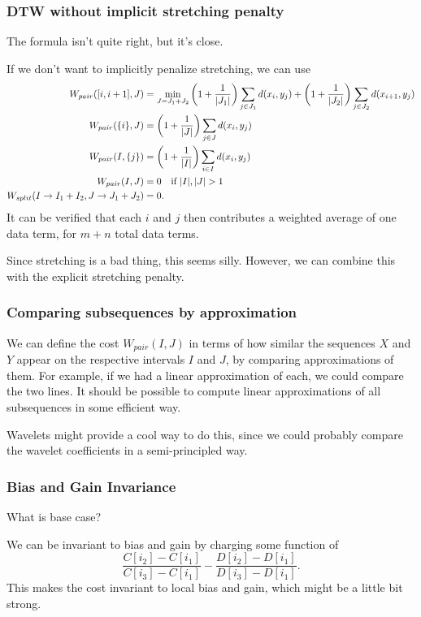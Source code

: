 \documentclass{article}
\begin{document}
\subsubsection{DTW without implicit stretching penalty}
The formula isn't quite right, but it's close.

If we don't want to implicitly penalize stretching, we can use
\begin{align*}
W_{pair}([i,i+1], J) &= \min_{J = J_1 + J_2} \left(1+ \frac{1}{|J_1|}\right) \sum_{j\in J_1} d(x_i,
y_j) + \left(1+ \frac{1}{|J_2|}\right) \sum_{j\in J_2} d(x_{i+1}, y_j)\\
W_{pair}(\{i\}, J) &= \left(1 + \frac{1}{|J|}\right) \sum_{j\in J} d(x_i, y_j) \\
W_{pair}(I, \{j\}) &= \left(1 + \frac{1}{|I|}\right) \sum_{i\in I} d(x_i, y_j) \\
W_{pair}(I, J) &= 0 \mbox{\quad if } |I|,|J| > 1 \\
W_{split}(I\to I_1 + I_2, J\to J_1 + J_2) &= 0.
\end{align*}
It can be verified that each $i$ and $j$ then contributes a weighted
average of one data term, for $m+n$ total data terms.

Since stretching is a bad thing, this seems silly. However, we can
combine this with the explicit stretching penalty.

\subsubsection{Comparing subsequences by approximation}

We can define the cost $W_{pair}(I,J)$ in terms of how similar the
sequences $X$ and $Y$ appear on the respective intervals $I$ and $J$,
by comparing approximations of them. For example, if we had a linear
approximation of each, we could compare the two lines. It should be
possible to compute linear approximations of all subsequences in some
efficient way.

Wavelets might provide a cool way to do this, since we could probably
compare the wavelet coefficients in a semi-principled way.

\subsubsection{Bias and Gain Invariance}

What is base case?

We can be invariant to bias and gain by charging some function of
$$\frac{C[i_2] - C[i_1]}{C[i_3] - C[i_1]} - \frac{D[i_2] - D[i_1]}{D[i_3] - D[i_1]}.$$
This makes the cost invariant to local bias and gain, which might be a little bit strong.
\end{document}
